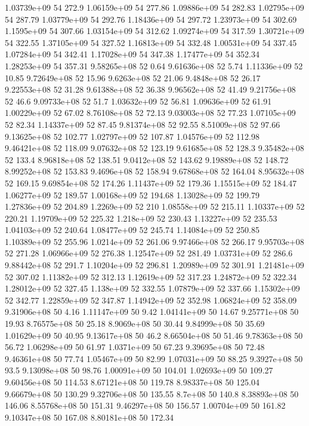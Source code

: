 1.03739e+09 54 272.9
1.06159e+09 54 277.86
1.09886e+09 54 282.83
1.02795e+09 54 287.79
1.03779e+09 54 292.76
1.18436e+09 54 297.72
1.23973e+09 54 302.69
1.1595e+09 54 307.66
1.03154e+09 54 312.62
1.09274e+09 54 317.59
1.30721e+09 54 322.55
1.37105e+09 54 327.52
1.16813e+09 54 332.48
1.00531e+09 54 337.45
1.07284e+09 54 342.41
1.17028e+09 54 347.38
1.17477e+09 54 352.34
1.28253e+09 54 357.31
9.58265e+08 52 0.64
9.61636e+08 52 5.74
1.11336e+09 52 10.85
9.72649e+08 52 15.96
9.6263e+08 52 21.06
9.4848e+08 52 26.17
9.22553e+08 52 31.28
9.61388e+08 52 36.38
9.96562e+08 52 41.49
9.21756e+08 52 46.6
9.09733e+08 52 51.7
1.03632e+09 52 56.81
1.09636e+09 52 61.91
1.00229e+09 52 67.02
8.76108e+08 52 72.13
9.03003e+08 52 77.23
1.07105e+09 52 82.34
1.14337e+09 52 87.45
9.81374e+08 52 92.55
8.51009e+08 52 97.66
9.13625e+08 52 102.77
1.02797e+09 52 107.87
1.04576e+09 52 112.98
9.46421e+08 52 118.09
9.07632e+08 52 123.19
9.61685e+08 52 128.3
9.35482e+08 52 133.4
8.96818e+08 52 138.51
9.0412e+08 52 143.62
9.19889e+08 52 148.72
8.99252e+08 52 153.83
9.4696e+08 52 158.94
9.67868e+08 52 164.04
8.95632e+08 52 169.15
9.69854e+08 52 174.26
1.11437e+09 52 179.36
1.15515e+09 52 184.47
1.06277e+09 52 189.57
1.00168e+09 52 194.68
1.13028e+09 52 199.79
1.27836e+09 52 204.89
1.2269e+09 52 210
1.08558e+09 52 215.11
1.10337e+09 52 220.21
1.19709e+09 52 225.32
1.218e+09 52 230.43
1.13227e+09 52 235.53
1.04103e+09 52 240.64
1.08477e+09 52 245.74
1.14084e+09 52 250.85
1.10389e+09 52 255.96
1.0214e+09 52 261.06
9.97466e+08 52 266.17
9.95703e+08 52 271.28
1.06966e+09 52 276.38
1.12547e+09 52 281.49
1.03731e+09 52 286.6
9.88442e+08 52 291.7
1.10204e+09 52 296.81
1.20989e+09 52 301.91
1.21481e+09 52 307.02
1.11382e+09 52 312.13
1.12619e+09 52 317.23
1.24872e+09 52 322.34
1.28012e+09 52 327.45
1.138e+09 52 332.55
1.07879e+09 52 337.66
1.15302e+09 52 342.77
1.22859e+09 52 347.87
1.14942e+09 52 352.98
1.06824e+09 52 358.09
9.31906e+08 50 4.16
1.11147e+09 50 9.42
1.04141e+09 50 14.67
9.25771e+08 50 19.93
8.76575e+08 50 25.18
8.9069e+08 50 30.44
9.84999e+08 50 35.69
1.01629e+09 50 40.95
9.13617e+08 50 46.2
8.66504e+08 50 51.46
9.78363e+08 50 56.72
1.06298e+09 50 61.97
1.0371e+09 50 67.23
9.39695e+08 50 72.48
9.46361e+08 50 77.74
1.05467e+09 50 82.99
1.07031e+09 50 88.25
9.3927e+08 50 93.5
9.13098e+08 50 98.76
1.00091e+09 50 104.01
1.02693e+09 50 109.27
9.60456e+08 50 114.53
8.67121e+08 50 119.78
8.98337e+08 50 125.04
9.66679e+08 50 130.29
9.32706e+08 50 135.55
8.7e+08 50 140.8
8.38893e+08 50 146.06
8.55768e+08 50 151.31
9.46297e+08 50 156.57
1.00704e+09 50 161.82
9.10347e+08 50 167.08
8.80181e+08 50 172.34
